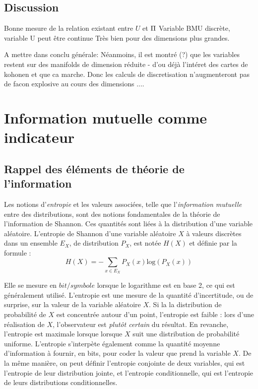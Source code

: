 \documentclass[../main]{subfiles}
\begin{document}
\subsection{Discussion}
Bonne mesure de la relation existant entre $U$ et $\Pi$
Variable BMU discrète, variable U peut être continue
Très bien pour des dimensions plus grandes.

A mettre dans conclu générale: 
Néanmoins, il est montré (?) que  les variables restent sur des manifolds de dimension réduite - d'ou déjà l'intéret des cartes de kohonen et que ca marche. Donc les calculs de discretisation n'augmenteront pas de facon explosive au cours des dimensions ....


\section{Information mutuelle comme indicateur}

\subsection{Rappel des éléments de théorie de l'information}

Les notions d'\emph{entropie} et les valeurs associées, telle que l'\emph{information mutuelle} entre des distributions, sont des notions fondamentales de la théorie de l'information de Shannon. Ces quantités sont liées à la distribution d'une variable aléatoire.
L'entropie de Shannon d'une variable aléatoire $X$ à valeurs discrètes dans un ensemble $E_X$, de distribution $P_X$, est notée $H(X)$ et définie par la formule : 
\begin{equation}
H(X) = - \sum_{x \in E_X}{P_X(x)\textrm{log}(P_X(x))}
\end{equation}

Elle se mesure en $bit/symbole$ lorsque le logarithme est en base 2, ce qui est généralement utilisé. 
L'entropie est une mesure de la quantité d'incertitude, ou de surprise, sur la valeur de la variable aléatoire $X$. Si la la distribution de probabilité de $X$ est concentrée autour d'un point, l'entropie est faible : lors d'une réalisation de $X$, l'observateur est \emph{plutôt certain} du résultat. En revanche, l'entropie est maximale lorsque lorsque $X$ suit une distribution de probabilité uniforme.
L'entropie s'interpète également comme la quantité moyenne d'information à fournir, en bits, pour coder la valeur que prend la variable $X$.
De la même manière, on peut définir l'entropie conjointe de deux variables, qui est l'entropie de leur distribution jointe, et l'entropie conditionnelle, qui est l'entropie de leurs distributions conditionnelles.
\end{document}
